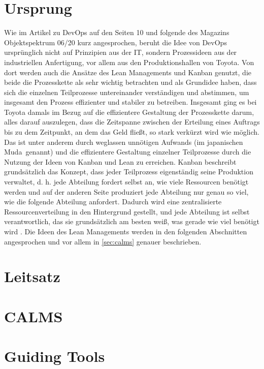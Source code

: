 \section{Ursprung}

Wie im Artikel zu \ac{DevOps} auf den Seiten 10 und folgende des Magazins Objektspektrum 06/20 \cite{spektrum1} kurz angesprochen, beruht die Idee von \ac{DevOps} ursprünglich nicht auf Prinzipien aus der IT, sondern Prozessideen aus der industriellen Anfertigung, vor allem aus den Produktionshallen von Toyota. Von dort werden auch die Ansätze des Lean Managements und Kanban genutzt, die beide die Prozesskette als sehr wichtig betrachten und als Grundidee haben, dass sich die einzelnen Teilprozesse untereinander verständigen und abstimmen, um insgesamt den Prozess effizienter und stabiler zu betreiben. Insgesamt ging es bei Toyota damals im Bezug auf die effizientere Gestaltung der Prozesskette darum, alles darauf auszulegen, dass die Zeitspanne zwischen der Erteilung eines Auftrags bis zu dem Zeitpunkt, an dem das Geld fließt, so stark verkürzt wird wie möglich. \cite{halstenberg:2020} Das ist unter anderem durch weglassen unnötigen Aufwands (im japanischen \glqq Muda\grqq\ genannt) und die effizientere Gestaltung einzelner Teilprozesse durch die Nutzung der Ideen von Kanban und Lean zu erreichen. Kanban beschreibt grundsätzlich das Konzept, dass jeder Teilprozess eigenständig seine Produktion verwaltet, d. h. jede Abteilung fordert selbst an, wie viele Ressourcen benötigt werden und auf der anderen Seite produziert jede Abteilung nur genau so viel, wie die folgende Abteilung anfordert. Dadurch wird eine zentralisierte Ressourcenverteilung in den Hintergrund gestellt, und jede Abteilung ist selbst verantwortlich, das sie grundsätzlich am besten weiß, was gerade wie viel benötigt wird \cite{ohno:1988}. Die Ideen des Lean Managements werden in den folgenden Abschnitten angesprochen und vor allem in \autoref{sec:calms} genauer beschrieben.

\section{Leitsatz}

\section{CALMS}\label{sec:calms}

\section{Guiding Tools}